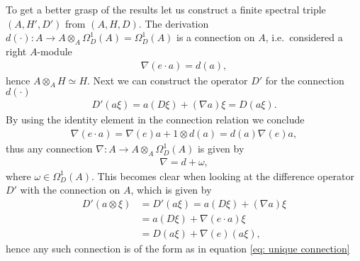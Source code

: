 To get a better grasp of the results let us construct a finite spectral
triple $(A, H', D')$ from $(A, H, D)$. The derivation $d(\cdot):A \rightarrow
A\otimes _A \Omega_D^1(A)=\Omega_D^1(A)$ is a connection on $A$, i.e.\ considered a
right $A$-module
\begin{align}
        \nabla(e \cdot a) =  d(a),
\end{align}
hence $A\otimes_A H\simeq H$. Next we can construct the operator $D'$
for the connection $d(\cdot)$
\begin{align}
    D'(a\xi) = a(D\xi) + (\nabla a) \xi = D(a\xi).
\end{align}
By using the identity element in the connection relation we conclude
\begin{align}
   \nabla (e\cdot a) = \nabla(e) a + 1 \otimes d(a)=d(a) \nabla(e) a,
\end{align}
thus any connection $\nabla: A\rightarrow A\otimes_A \Omega_D^1(A)$ is
given by
\begin{align}\label{eq: unique connection}
    \nabla = d + \omega,
\end{align}
where $\omega \in \Omega_D^1(A)$. This becomes clear when looking at the
difference operator $D'$ with the connection on $A$, which is given by
\begin{align}
    D'(a\otimes \xi) &= D'(a \xi) = a(D\xi) + (\nabla a)\xi \nonumber \\
                     &=a(D\xi) + \nabla(e \cdot a) \xi \nonumber\\
                     &= D(a\xi) + \nabla(e) (a\xi),
\end{align}
hence any such connection is of the form as in equation \eqref{eq: unique connection}


